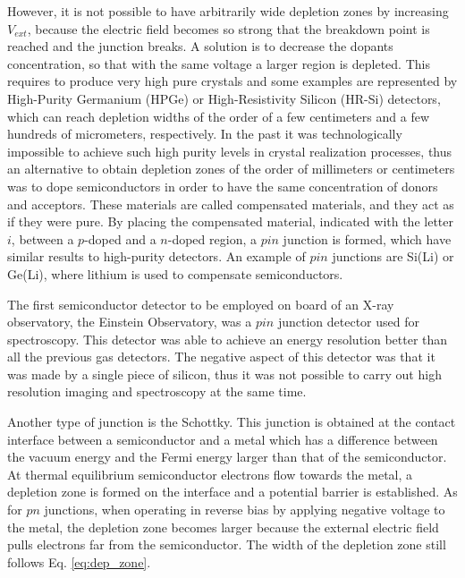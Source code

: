 However, it is not possible to have arbitrarily wide depletion zones by increasing $V_{ext}$, because the electric field becomes so strong that the breakdown point is reached and the junction breaks. A solution is to decrease the dopants concentration, so that with the same voltage a larger region is depleted. This requires to produce very high pure crystals and some examples are represented by High-Purity Germanium (HPGe) or High-Resistivity Silicon (HR-Si) detectors, which can reach depletion widths of the order of a few centimeters and a few hundreds of micrometers, respectively. In the past it was technologically impossible to achieve such high purity levels in crystal realization processes, thus an alternative to obtain depletion zones of the order of millimeters or centimeters was to dope semiconductors in order to have the same concentration of donors and acceptors. These materials are called compensated materials, and they act as if they were pure. By placing the compensated material, indicated with the letter $i$, between a $p$-doped and a $n$-doped region, a $pin$ junction is formed, which have similar results to high-purity detectors. An example of $pin$ junctions are Si(Li) or Ge(Li), where lithium is used to compensate semiconductors.

The first semiconductor detector to be employed on board of an X-ray observatory, the Einstein Observatory, was a $pin$ junction detector used for spectroscopy. This detector was able to achieve an energy resolution better than all the previous gas detectors. The negative aspect of this detector was that it was made by a single piece of silicon, thus it was not possible to carry out high resolution imaging and spectroscopy at the same time.
%

Another type of junction is the Schottky. This junction is obtained at the contact interface between a semiconductor and a metal which has a difference between the vacuum energy and the Fermi energy larger than that of the semiconductor. At thermal equilibrium semiconductor electrons flow towards the metal, a depletion zone is formed on the interface and a potential barrier is established. As for $pn$ junctions, when operating in reverse bias by applying negative voltage to the metal, the depletion zone becomes larger because the external electric field pulls electrons far from the semiconductor. The width of the depletion zone still follows Eq. \ref{eq:dep_zone}.

